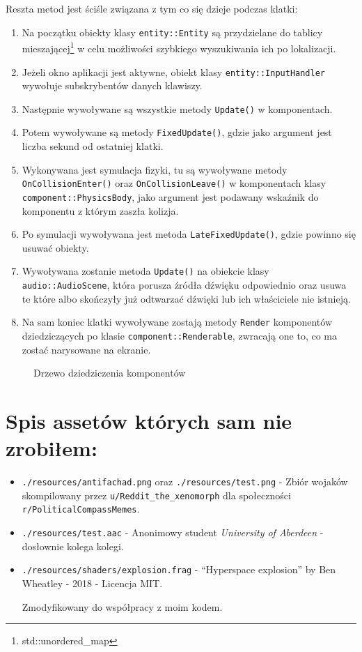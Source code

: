\documentclass[a4paper,11pt]{article}
\begin{document}
Reszta metod jest ściśle związana z tym co się dzieje podczas klatki:

\begin{enumerate}
    \item Na początku obiekty klasy \texttt{entity::Entity} są przydzielane do tablicy mieszającej\footnote{std::unordered\_map} w celu możliwości szybkiego wyszukiwania ich po lokalizacji.
    \item Jeżeli okno aplikacji jest aktywne, obiekt klasy \texttt{entity::InputHandler} wywołuje subskrybentów danych klawiszy.
    \item Następnie wywoływane są wszystkie metody \texttt{Update()} w komponentach.
    \item Potem wywoływane są metody \texttt{FixedUpdate()}, gdzie jako argument jest liczba sekund od ostatniej klatki.
    \item Wykonywana jest symulacja fizyki, tu są wywoływane metody \texttt{OnCollisionEnter()} oraz \texttt{OnCollisionLeave()} w komponentach klasy \texttt{component::PhysicsBody}, jako argument jest podawany wskaźnik do komponentu z którym zaszła kolizja.
    \item Po symulacji wywoływana jest metoda \texttt{LateFixedUpdate()}, gdzie powinno się usuwać obiekty.
    \item Wywoływana zostanie metoda \texttt{Update()} na obiekcie klasy \texttt{audio::AudioScene}, która porusza źródła dźwięku odpowiednio oraz usuwa te które albo skończyły już odtwarzać dźwięki lub ich właściciele nie istnieją.
    \item Na sam koniec klatki wywoływane zostają metody \texttt{Render} komponentów dziedziczących po klasie \texttt{component::Renderable}, zwracają one to, co ma zostać narysowane na ekranie.
\end{enumerate}


\begin{figure}
    \resizebox{\textwidth}{!}{%
    }
    \centering
    \caption{Drzewo dziedziczenia komponentów}\label{rys:component}
\end{figure}

\section*{Spis assetów których sam nie zrobiłem:}

\begin{itemize}
    \item \texttt{./resources/antifachad.png} oraz \texttt{./resources/test.png} - Zbiór wojaków skompilowany przez \texttt{u/Reddit\_the\_xenomorph} dla społeczności \texttt{r/PoliticalCompassMemes}.
    \item \texttt{./resources/test.aac} - Anonimowy student \emph{University of Aberdeen} - dosłownie kolega kolegi.
    \item \texttt{./resources/shaders/explosion.frag} - ``Hyperspace explosion'' by Ben Wheatley - 2018 - Licencja MIT.
    
    Zmodyfikowany do współpracy z moim kodem.
\end{itemize}
\end{document}
